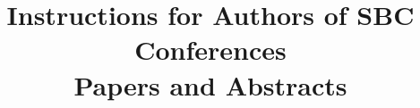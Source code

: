 
\title{Instructions for Authors of SBC Conferences\\ Papers and Abstracts}

\address{Instituto de Informática -- Universidade Federal do Rio Grande do Sul
  (UFRGS)\\
  Caixa Postal 15.064 -- 91.501-970 -- Porto Alegre -- RS -- Brazil
\nextinstitute
  Department of Computer Science -- University of Durham\\
  Durham, U.K.
\nextinstitute
  Departamento de Sistemas e Computação\\
  Universidade Regional de Blumenal (FURB) -- Blumenau, SC -- Brazil
}

\maketitle

\begin{abstract}
  
\end{abstract}















